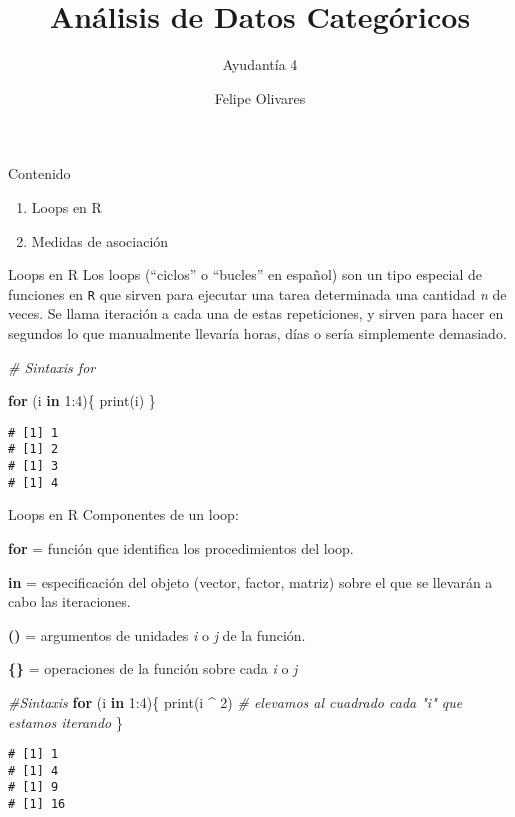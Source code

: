 \documentclass[
  8pt,
  ignorenonframetext,
]{beamer}
\title{Análisis de Datos Categóricos}
\author{Ayudantía 4}
\date{Felipe Olivares}
\newenvironment{Shaded}{\begin{snugshade}}{\end{snugshade}}
\newcommand{\CommentTok}[1]{\textcolor[rgb]{0.56,0.35,0.01}{\textit{#1}}}
\newcommand{\ControlFlowTok}[1]{\textcolor[rgb]{0.13,0.29,0.53}{\textbf{#1}}}
\newcommand{\DecValTok}[1]{\textcolor[rgb]{0.00,0.00,0.81}{#1}}
\newcommand{\FunctionTok}[1]{\textcolor[rgb]{0.00,0.00,0.00}{#1}}
\newcommand{\NormalTok}[1]{#1}
\newcommand{\SpecialCharTok}[1]{\textcolor[rgb]{0.00,0.00,0.00}{#1}}
\begin{document}
\frame{\titlepage}

\begin{frame}{Contenido}
\protect\hypertarget{contenido}{}
\begin{enumerate}
\item
  Loops en R
\item
  Medidas de asociación
\end{enumerate}
\end{frame}

\begin{frame}[fragile]{Loops en R}
\protect\hypertarget{loops-en-r}{}
Los loops (``ciclos'' o ``bucles'' en español) son un tipo especial de
funciones en \texttt{R} que sirven para ejecutar una tarea determinada
una cantidad \emph{n} de veces. Se llama iteración a cada una de estas
repeticiones, y sirven para hacer en segundos lo que manualmente
llevaría horas, días o sería simplemente demasiado.

\begin{Shaded}
\begin{Highlighting}[]
\CommentTok{\# Sintaxis for}

\ControlFlowTok{for}\NormalTok{ (i }\ControlFlowTok{in} \DecValTok{1}\SpecialCharTok{:}\DecValTok{4}\NormalTok{)\{}
  \FunctionTok{print}\NormalTok{(i)}
\NormalTok{\}}
\end{Highlighting}
\end{Shaded}

\begin{verbatim}
# [1] 1
# [1] 2
# [1] 3
# [1] 4
\end{verbatim}
\end{frame}

\begin{frame}[fragile]{Loops en R}
\protect\hypertarget{loops-en-r-1}{}
Componentes de un loop:

\textbf{for} = función que identifica los procedimientos del loop.

\textbf{in} = especificación del objeto (vector, factor, matriz) sobre
el que se llevarán a cabo las iteraciones.

\textbf{()} = argumentos de unidades \emph{i} o \emph{j} de la función.

\textbf{\{\}} = operaciones de la función sobre cada \emph{i} o \emph{j}

\begin{Shaded}
\begin{Highlighting}[]
\CommentTok{\#Sintaxis}
\ControlFlowTok{for}\NormalTok{ (i }\ControlFlowTok{in} \DecValTok{1}\SpecialCharTok{:}\DecValTok{4}\NormalTok{)\{}
\FunctionTok{print}\NormalTok{(i }\SpecialCharTok{\^{}} \DecValTok{2}\NormalTok{)  }\CommentTok{\# elevamos al cuadrado cada "i" que estamos iterando}
\NormalTok{\}}
\end{Highlighting}
\end{Shaded}

\begin{verbatim}
# [1] 1
# [1] 4
# [1] 9
# [1] 16
\end{verbatim}
\end{frame}
\end{document}
